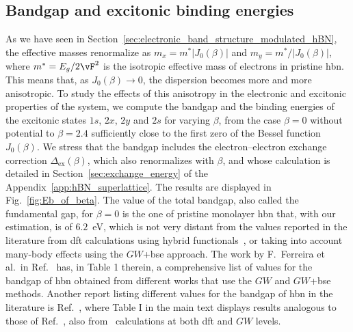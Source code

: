 \subsection{Bandgap and excitonic binding energies}
\label{subsec:band_gap_and_binding_energies}

As we have seen in Section~\ref{sec:electronic_band_structure_modulated_hBN}, the effective masses renormalize as $m_x = m^* |J_{0}(\beta)|$ and $m_y = m^*/ |J_{0}(\beta)| $, where $m^* = E_g/2\vF^2$ is the isotropic effective mass of electrons in pristine \gls{hbn}.
This means that, as $J_{0}(\beta) \to 0$, the dispersion becomes more and more anisotropic.
To study the effects of this anisotropy in the electronic and excitonic properties of the system, we compute the bandgap and the binding energies of the excitonic states $1s$, $2x$, $2y$ and $2s$ for varying $\beta$, from the case $\beta=0$ without potential to $\beta=2.4$ sufficiently close to the first zero of the Bessel function $J_0(\beta)$.
We stress that the bandgap includes the electron--electron exchange correction $\Delta_{\mathrm{ex}}(\beta)$, which also renormalizes with $\beta$, and whose calculation is detailed in Section~\ref{sec:exchange_energy} of the Appendix~\ref{app:hBN_superlattice}.
The results are displayed in Fig.~\ref{fig:Eb_of_beta}.
The value of the total bandgap, also called the fundamental gap, for $\beta=0$ is the one of pristine monolayer \gls{hbn} that, with our estimation, is of $6.2$~\unit{\electronvolt}, which is not very distant from the values reported in the literature from \gls{dft} calculations using hybrid functionals~\cite{PhysRevB.106.045118}, or taking into account many-body effects using the $GW$+\gls{bse} approach.
The work by F.~Ferreira et al.~in Ref.~\cite{Ferreira_2019} has, in Table 1 therein, a comprehensive list of values for the bandgap of \gls{hbn} obtained from different works that use the $GW$ and $GW$+\gls{bse} methods.
Another report listing different values for the bandgap of \gls{hbn} in the literature is Ref.~\cite{PhysRevB.106.045118}, where Table I in the main text displays results analogous to those of Ref.~\cite{Ferreira_2019}, also from \abinit~calculations at both \gls{dft} and $GW$ levels.

